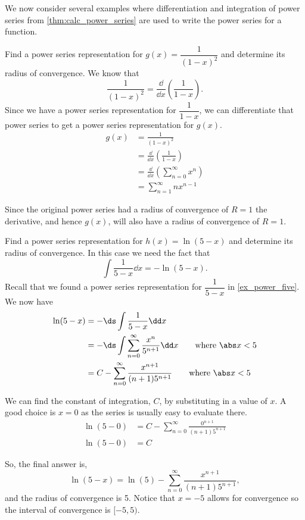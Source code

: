 We now consider several examples where differentiation and integration of power series from \autoref{thm:calc_power_series} are used to write the power series for a function. %

\begin{example}\label{ex_power_deriv}
Find a power series representation for $g(x)=\dfrac1{(1-x)^2}$ and determine its radius of convergence.
\solution
We know that
\[\frac1{(1-x)^2} = \frac{\dd}{\dd x} \left( \frac{1}{1-x} \right).\]
Since we have a power series  representation for $\dfrac1{1-x}$, we can differentiate that power series to get a power series representation for $g(x)$.  
\begin{align*}
	g(x)
	& = \frac{1}{(1-x)^2} \\
    & = \frac{\dd}{\dd x} \left( \frac{1}{1-x} \right) \\
	& =  \frac{\dd}{\dd x} \left( \sum_{n=0}^{\infty} x^n \right)\\
    & =  \sum_{n=1}^{\infty} nx^{n-1}
\end{align*}

Since the original power series had a radius of convergence of $R=1$ the derivative, and hence $g(x)$, will also have a radius of convergence of $R=1$.
\end{example}

\begin{example}\label{ex_power_int}
Find a power series representation for $h(x)=\ln(5-x)$ and determine its radius of convergence.
\solution
In this case we need the fact that
\[\int\frac1{5-x}\dd x=-\ln(5-x).\]
Recall that we found a power series representation for $\dfrac1{5-x}$ in \autoref{ex_power_five}. We now have
\begin{align*}
	\ln(5-x)
	& =  -\ds\int \frac{1}{5-x}\dd x \\
    & =  -\ds\int \sum_{n=0}^{\infty} \frac{x^n}{5^{n+1}}\dd x \qquad\text{where $\abs x<5$}\\
	& =  C - \sum_{n=0}^{\infty} \frac{x^{n+1}}{(n+1)5^{n+1}} \qquad\text{where $\abs x<5$}
\end{align*}

We can find the constant of integration, $C$, by substituting in a value of $x$.  A good choice is $x=0$ as the series is usually easy to evaluate there.  
\begin{align*}
	\ln(5-0) & = C - \sum_{n=0}^{\infty} \frac{0^{n+1}}{(n+1)5^{n+1}} \\
	\ln (5-0) & =  C 
\end{align*}

So, the final answer is, 
\[\ln(5-x) =\ln(5) - \sum_{n=0}^{\infty} \frac{x^{n+1}}{(n+1)5^{n+1}},\]
and the radius of convergence is 5. Notice that $x=-5$ allows for convergence so the interval of convergence is $[-5,5)$.
\end{example}


